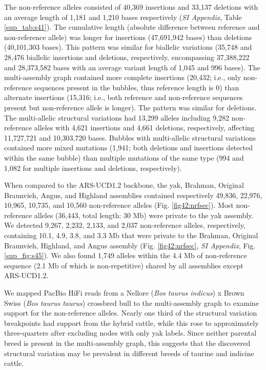 \documentclass[../main.tex]{subfiles}
\begin{document}
The non-reference alleles consisted of 40,369 insertions and 33,137 deletions with an average length of 1,181 and 1,210 bases respectively (\emph{SI Appendix}, Table \ref{sup_tab:s41}). The cumulative length (absolute difference between reference and non-reference allele) was longer for insertions (47,691,942 bases) than deletions (40,101,303 bases). This pattern was similar for biallelic variations (35,748 and 28,476 biallelic insertions and deletions, respectively, encompassing 37,388,222 and 28,373,582 bases with an average variant length of 1,045 and 996 bases). The multi-assembly graph contained more complete insertions (20,432; i.e., only non-reference sequences present in the bubbles, thus reference length is 0) than alternate insertions (15,316; i.e., both reference and non-reference sequences present but non-reference allele is longer). The pattern was similar for deletions. The multi-allelic structural variations had 13,299 alleles including 9,282 non-reference alleles with 4,621 insertions and 4,661 deletions, respectively, affecting 11,727,721 and 10,303,720 bases. Bubbles with multi-allelic structural variations contained more mixed mutations (1,941; both deletions and insertions detected within the same bubble) than multiple mutations of the same type (994 and 1,082 for multiple insertions and deletions, respectively). 

When compared to the ARS-UCD1.2 backbone, the yak, Brahman, Original Braunvieh, Angus, and Highland assemblies contained respectively 49,836, 22,976, 10,965, 10,735, and 10,560 non-reference alleles (Fig. \ref{fig42:nrfsec}). Most non-reference alleles (36,443, total length: 30 Mb) were private to the yak assembly. We detected 9,267, 2,232, 2,133, and 2,037 non-reference alleles, respectively, containing 10.1, 4.9, 3.8, and 3.3 Mb that were private to the Brahman, Original Braunvieh, Highland, and Angus assembly (Fig. \ref{fig42:nrfsec}, \emph{SI Appendix}, Fig. \ref{sup_fig:s45}). We also found 1,749 alleles within the 4.4 Mb of non-reference sequence (2.1 Mb of which is non-repetitive) shared by all assemblies except ARS-UCD1.2.

We mapped PacBio HiFi reads from a Nellore (\emph{Bos taurus indicus}) x Brown Swiss (\emph{Bos taurus taurus}) crossbred bull to the multi-assembly graph to examine support for the non-reference alleles. Nearly one third of the structural variation breakpoints had support from the hybrid cattle, while this rose to approximately three-quarters after excluding nodes with only yak labels. Since neither parental breed is present in the multi-assembly graph, this suggests that the discovered structural variation may be prevalent in different breeds of taurine and indicine cattle. 
\end{document}
